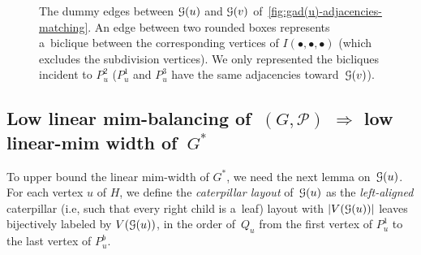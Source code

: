 \documentclass[a4paper,UKenglish,cleveref,hyperref,autoref]{lipics-v2021}
\begin{document}
\begin{figure}[h!]
  \caption{The dummy edges between $\mathcal G(u)$ and $\mathcal G(v)$ of~\cref{fig:gad(u)-adjacencies-matching}.
  An edge between two rounded boxes represents a~biclique between the corresponding vertices of $I(\bullet,\bullet,\bullet)$ (which excludes the subdivision vertices).
  We only represented the bicliques incident to $P_u^2$ ($P_u^1$ and $P_u^3$ have the same adjacencies toward~$\mathcal G(v)$). }
  \label{fig:gad(u)-adjacencies-dummy}
\end{figure}

\subsection{Low linear mim-balancing of~$(G,\mathcal P)$ $\Rightarrow$ low linear-mim width of~$G^*$}\label{sec:lin-mim-balancing-to-lin-mim-width}

To upper bound the linear mim-width of $G^*$, we need the next lemma on~$\mathcal G(u)$.
For each vertex $u$ of $H$, we define the \emph{caterpillar layout} of~$\mathcal G(u)$ as the \emph{left-aligned} caterpillar (i.e, such that every right child is a~leaf) layout with $|V(\mathcal G(u))|$ leaves bijectively labeled by $V(\mathcal G(u))$, in the order of~$Q_u$ from the first vertex of $P_u^1$ to the last vertex of $P_u^b$.
\end{document}
